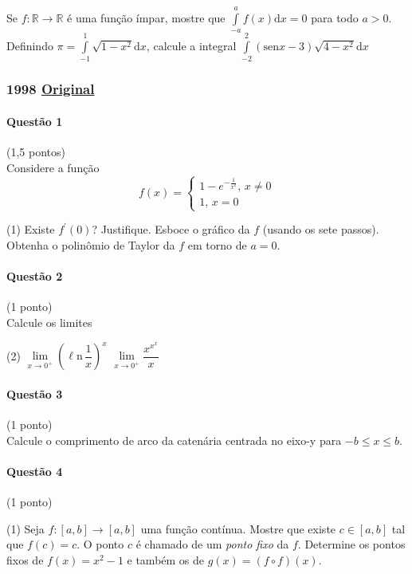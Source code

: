 \documentclass[12pt,a4paper]{article}
\newcommand{\R}{\mathbb{R}}
\newcommand{\sen}{\mathrm{sen}}
\newcommand{\dd}{\mathrm{d}}
\newcommand{\Ln}{\ell\mathrm{n}}
\newcommand{\original}[1]{\tiny \href{#1}{Original} \normalsize}
\begin{document}
\begin{tasks}
\task Se $f: \R \to \R$ é uma função ímpar, mostre que $\displaystyle\int\limits_{-a}^a f(x) \dd x = 0$ para todo $a>0$.
\task Definindo $\pi = \displaystyle\int\limits_{-1}^1 \sqrt{1-x^2} \dd x$, calcule a integral $\displaystyle\int\limits_{-2}^{2}(\sen x - 3) \sqrt{4-x^2}\dd x$
\end{tasks}

\newpage

\subsubsection{1998 \original{https://drive.google.com/open?id=1UCHV2gm9jw99ERNvxjgy709G47crLp4T}}

\paragraph{Questão 1} (1,5 pontos)\\
Considere a função$$f(x) = \begin{cases}1-e^{-\frac{1}{x^2}},\, x\neq 0 \\ 1, \, x=0 \end{cases}$$\begin{tasks}(1)
\task Existe $f^{\prime}(0)$? Justifique.
\task Esboce o gráfico da $f$ (usando os sete passos).
\task Obtenha o polinômio de Taylor da $f$ em torno de $a=0$.
\end{tasks}

\paragraph{Questão 2} (1 ponto)\\
Calcule os limites
\begin{tasks}(2)
\task $\lim\limits_{x \to 0^+} \left(\Ln \,\dfrac{1}{x} \right)^x$
\task $\lim\limits_{x\to 0^+} \dfrac{x^{x^x}}{x}$
\end{tasks}

\paragraph{Questão 3} (1 ponto)\\
Calcule o comprimento de arco da catenária centrada no eixo-y para $-b \le x \le b$.

\paragraph{Questão 4} (1 ponto)\begin{tasks}(1)
\task Seja $f: [a,b] \to [a,b]$ uma função contínua. Mostre que existe $c\in [a,b]$ tal que $f(c) = c$. O ponto $c$ é chamado de um \textit{ponto fixo} da $f$.
\task Determine os pontos fixos de $f(x) = x^2-1$ e também os de $g(x) = (f\circ f)(x)$.
\end{tasks}
\end{document}
